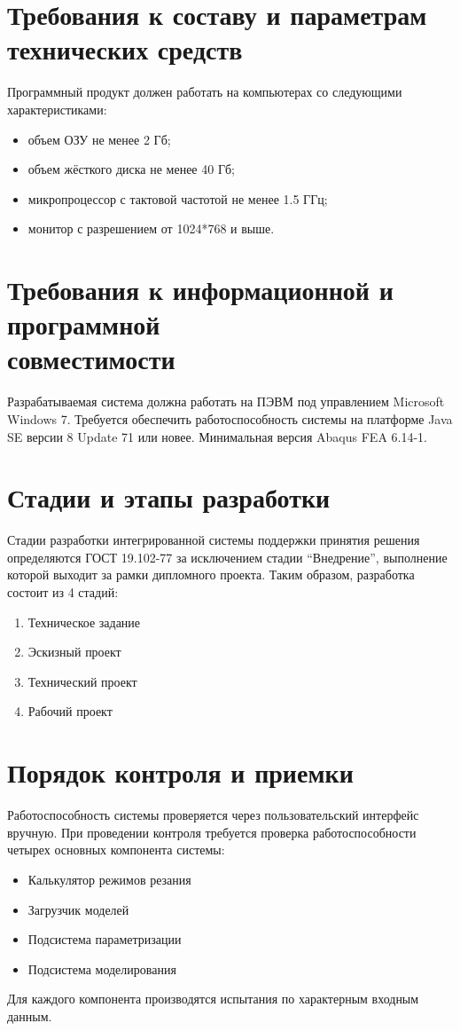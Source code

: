 \documentclass[14pt,oneside,final]{extreport}
\newcommand*\minus{\item[--]} %
\begin{document}
	\section{Требования к составу и параметрам технических средств}
	Программный продукт должен работать на компьютерах со следующими характеристиками:
	\begin{itemize}
		\minus объем ОЗУ не менее 2 Гб;
		\minus объем жёсткого диска не менее 40 Гб;
		\minus микропроцессор с тактовой частотой не менее 1.5 ГГц;
		\minus монитор с разрешением от 1024*768 и выше.
	\end{itemize}

	\section[Требования к информационной и программной совместимости]{Требования к информационной и программной \\совместимости}
	Разрабатываемая система должна работать на ПЭВМ под управлением Microsoft Windows 7. Требуется обеспечить работоспособность системы на платформе Java SE версии 8 Update 71 или новее. Минимальная версия Abaqus FEA 6.14-1.
	
	\section{Стадии и этапы разработки}
	Стадии разработки интегрированной системы поддержки принятия решения определяются ГОСТ 19.102-77 за исключением стадии ``Внедрение'', выполнение которой выходит за рамки дипломного проекта. Таким образом, разработка  состоит из 4 стадий:
	\begin{enumerate}
		\item Техническое задание
		\item Эскизный проект
		\item Технический проект
		\item Рабочий проект
	\end{enumerate}
	
	\section{Порядок контроля и приемки}
	Работоспособность системы проверяется через пользовательский интерфейс вручную.	При проведении контроля требуется проверка работоспособности четырех основных компонента системы: 
	\begin{itemize}
		\item Калькулятор режимов резания 
		\item Загрузчик моделей 
		\item Подсистема параметризации
		\item Подсистема моделирования
	\end{itemize}
	Для каждого компонента производятся испытания по характерным входным данным. 
\end{document}

